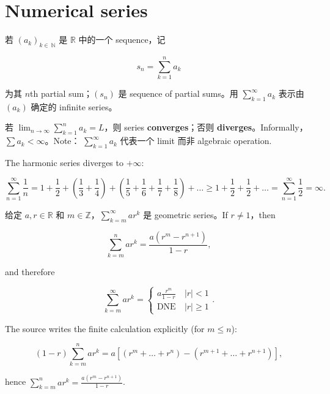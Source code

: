 \chapter{Numerical series}

\begin{definition}{}

若 \(\left( a_{k} \right)_{k \in \ \mathbb{N}}\) 是 \(\mathbb{R}\) 中的一个 sequence，记

\[s_{n} = \sum\limits_{k = 1}^{n}a_{k}\]

为其 \(n\)th partial sum；\(\left( s_{n} \right)\) 是 sequence of partial sums。用 \(\sum_{k = 1}^{\infty}a_{k}\) 表示由 \(\left( a_{k} \right)\) 确定的 infinite series。

若 \(\lim_{n\rightarrow\infty}\sum_{k = 1}^{n}a_{k} = L\)，则 series \textbf{converges}；否则 \textbf{diverges}。Informally，\(\sum a_{k} < \infty\)。Note： \(\sum_{k = 1}^{\infty}a_{k}\) 代表一个 limit 而非 algebraic operation.

\end{definition}

\begin{example}

The harmonic series diverges to \(+ \infty\):

\[\sum\limits_{n = 1}^{\infty}\frac{1}{n} = 1 + \frac{1}{2} + \left( {\frac{1}{3} + \frac{1}{4}} \right) + \left( {\frac{1}{5} + \frac{1}{6} + \frac{1}{7} + \frac{1}{8}} \right) + \ldots \geq 1 + \frac{1}{2} + \frac{1}{2} + \ldots = \sum\limits_{n = 1}^{\infty}\frac{1}{2} = \infty.\]

给定 \(a,r \in \mathbb{R}\) 和 \(m \in \mathbb{Z}\)，\(\sum_{k = m}^{\infty}ar^{k}\) 是 geometric series。If \(r \neq 1\)，then

\[\sum\limits_{k = m}^{n}ar^{k} = \frac{a\left( {r^{m} - r^{n + 1}} \right)}{1 - r},\]

and therefore

\[\sum\limits_{k = m}^{\infty}ar^{k} = \left\{ \begin{matrix}
{a\frac{r^{m}}{1 - r}} & {|r| < 1} \\
{\text{DNE}\ } & {|r| \geq 1}
\end{matrix} \right..\]

The source writes the finite calculation explicitly (for \(m \leq n\)):

\[\left( {1 - r} \right)\sum\limits_{k = m}^{n}ar^{k} = a\left\lbrack {\left( {r^{m} + \ldots + r^{n}} \right) - \left( {r^{m + 1} + \ldots + r^{n + 1}} \right)} \right\rbrack,\]

hence \(\sum_{k = m}^{n}ar^{k} = \frac{a\left( {r^{m} - r^{n + 1}} \right)}{1 - r}\).

\end{example}

